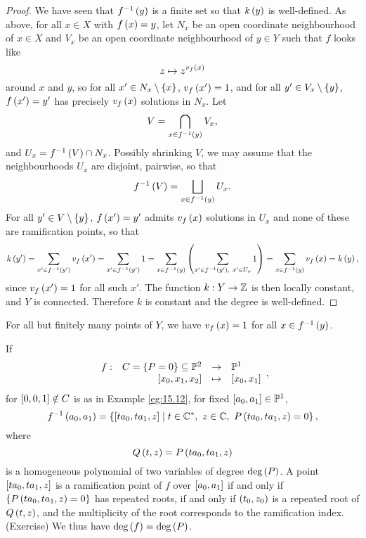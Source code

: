 
\begin{proof}
We have seen that $ f^{-1}\rb{y} $ is a finite set so that $ k\rb{y} $ is well-defined. As above, for all $ x \in X $ with $ f\rb{x} = y $, let $ N_x $ be an open coordinate neighbourhood of $ x \in X $ and $ V_x $ be an open coordinate neighbourhood of $ y \in Y $ such that $ f $ looks like
$$ z \mapsto z^{v_f\rb{x}} $$
around $ x $ and $ y $, so for all $ x' \in N_x \setminus \cb{x} $, $ v_f\rb{x'} = 1 $, and for all $ y' \in V_x \setminus \cb{y} $, $ f\rb{x'} = y' $ has precisely $ v_f\rb{x} $ solutions in $ N_x $. Let
$$ V = \bigcap_{x \in f^{-1}\rb{y}} V_x, $$
and $ U_x = f^{-1}\rb{V} \cap N_x $. Possibly shrinking $ V $, we may assume that the neighbourhoods $ U_x $ are disjoint, pairwise, so that
$$ f^{-1}\rb{V} = \bigsqcup_{x \in f^{-1}\rb{y}} U_x. $$
For all $ y' \in V \setminus \cb{y} $, $ f\rb{x'} = y' $ admits $ v_f\rb{x} $ solutions in $ U_x $ and none of these are ramification points, so that
$$ k\rb{y'} = \sum_{x' \in f^{-1}\rb{y'}} v_f\rb{x'} = \sum_{x' \in f^{-1}\rb{y'}} 1 = \sum_{x \in f^{-1}\rb{y}} \rb{\sum_{x' \in f^{-1}\rb{y'}, \ x' \in U_x} 1} = \sum_{x \in f^{-1}\rb{y}} v_f\rb{x} = k\rb{y}, $$
since $ v_f\rb{x'} = 1 $ for all such $ x' $. The function $ k : Y \to \Z $ is then locally constant, and $ Y $ is connected. Therefore $ k $ is constant and the degree is well-defined.
\end{proof}

\begin{remark*}
For all but finitely many points of $ Y $, we have $ v_f\rb{x} = 1 $ for all $ x \in f^{-1}\rb{y} $.
\end{remark*}

\begin{example}
\label{eg:17.11}
If
$$ \function[f]{C = \cb{P = 0} \subseteq \P^2}{\P^1}{\sb{x_0, x_1, x_2}}{\sb{x_0, x_1}}, $$
for $ \sb{0, 0, 1} \notin C $ is as in Example \ref{eg:15.12}, for fixed $ \sb{a_0, a_1} \in \P^1 $,
$$ f^{-1}\rb{a_0, a_1} = \cb{\sb{ta_0, ta_1, z} \mid t \in \C^*, \ z \in \C, \ P\rb{ta_0, ta_1, z} = 0}, $$
where
$$ Q\rb{t, z} = P\rb{ta_0, ta_1, z} $$
is a homogeneous polynomial of two variables of degree $ \deg\rb{P} $. A point $ \sb{ta_0, ta_1, z} $ is a ramification point of $ f $ over $ \sb{a_0, a_1} $ if and only if $ \cb{P\rb{ta_0, ta_1, z} = 0} $ has repeated roots, if and only if $ \rb{t_0, z_0} $ is a repeated root of $ Q\rb{t, z} $, and the multiplicity of the root corresponds to the ramification index. (Exercise) We thus have $ \deg\rb{f} = \deg\rb{P} $.
\end{example}

